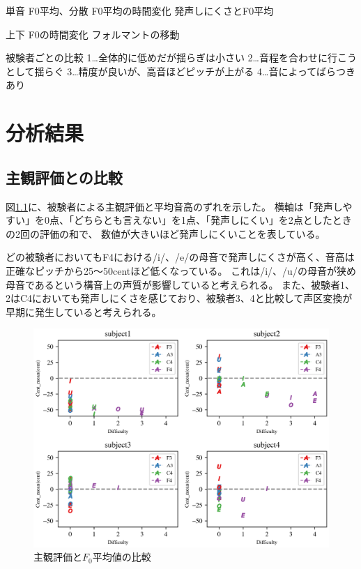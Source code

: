 \documentclass[10.5ptj,a4j,dvipdfmx,uplatex, oneside, openany]{jsbook}%
\begin{document}
単音
F0平均、分散
F0平均の時間変化
発声しにくさとF0平均

上下
F0の時間変化
フォルマントの移動


被験者ごとの比較
1…全体的に低めだが揺らぎは小さい
2…音程を合わせに行こうとして揺らぐ
3…精度が良いが、高音ほどピッチが上がる
4…音によってばらつきあり




\chapter{分析結果}

\section{主観評価との比較}
図\ref{difficulty}に、被験者による主観評価と平均音高のずれを示した。
横軸は「発声しやすい」を0点、「どちらとも言えない」を1点、「発声しにくい」を2点としたときの2回の評価の和で、
数値が大きいほど発声しにくいことを表している。

どの被験者においてもF4における/i/、/e/の母音で発声しにくさが高く、音高は正確なピッチから25〜50centほど低くなっている。
これは/i/、/u/の母音が狭め母音であるという構音上の声質が影響していると考えられる。
また、被験者1、2はC4においても発声しにくさを感じており、被験者3、4と比較して声区変換が早期に発生していると考えられる。


\begin{figure}[htbp]
    \begin{center}
      \includegraphics[clip,width=12.0cm]{ease.png}
      \caption{主観評価と$F_0$平均値の比較}
      \label{difficulty}
    \end{center}
\end{figure}
\end{document}
